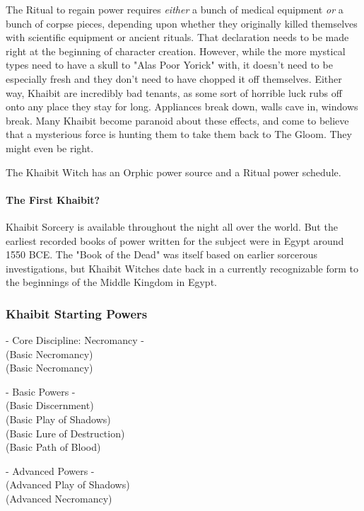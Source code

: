 The Ritual to regain power requires \textit{either} a bunch of medical equipment \textit{or} a bunch of corpse pieces, depending upon whether they originally killed themselves with scientific equipment or ancient rituals. That declaration needs to be made right at the beginning of character creation. However, while the more mystical types need to have a skull to "Alas Poor Yorick" with, it doesn't need to be especially fresh and they don't need to have chopped it off themselves. Either way, Khaibit are incredibly bad tenants, as some sort of horrible luck rubs off onto any place they stay for long. Appliances break down, walls cave in, windows break. Many Khaibit become paranoid about these effects, and come to believe that a mysterious force is hunting them to take them back to The Gloom. They might even be right.

The Khaibit Witch has an Orphic power source and a Ritual power schedule.

\paragraph{The First Khaibit?} Khaibit Sorcery is available throughout the night all over the world. But the earliest recorded books of power written for the subject were in Egypt around 1550 BCE. The "Book of the Dead" was itself based on earlier sorcerous investigations, but Khaibit Witches date back in a currently recognizable form to the beginnings of the Middle Kingdom in Egypt.

\subsubsection{Khaibit Starting Powers}

\hspace{\parindent} - Core Discipline: Necromancy -\\
 (Basic Necromancy)\\
 (Basic Necromancy)

- Basic Powers -\\
 (Basic Discernment)\\
 (Basic Play of Shadows)\\
 (Basic Lure of Destruction)\\
 (Basic Path of Blood)

- Advanced Powers -\\
 (Advanced Play of Shadows)\\
 (Advanced Necromancy)


